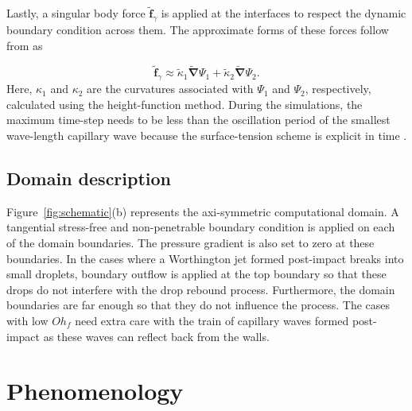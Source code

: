 Lastly, a singular body force $\boldsymbol{\tilde{f}}_\gamma$ is applied at the interfaces to respect the dynamic boundary condition across them. The approximate forms of these forces follow from \citet{brackbill1992continuum} as

\begin{equation}\label{Eqn::SurfaceTension}
	\boldsymbol{\tilde{f}}_\gamma \approx  \tilde{\kappa}_1\boldsymbol{\tilde{\nabla}}\Psi_1 +  \tilde{\kappa}_2\boldsymbol{\tilde{\nabla}}\Psi_2.
\end{equation}
\noindent Here, $\kappa_1$ and $\kappa_2$ are the curvatures associated with $\Psi_1$ and $\Psi_2$, respectively, calculated using the height-function method.  During the simulations, the maximum time-step needs to be less than the oscillation period of the smallest wave-length capillary wave because the surface-tension scheme is explicit in time \citep{popinet2009accurate, basiliskpopinet2}.

\subsection{Domain description}
Figure~\ref{fig:schematic}(b) represents the axi-symmetric computational domain. A tangential stress-free and non-penetrable boundary condition is applied on each of the domain boundaries. The pressure gradient is also set to zero at these boundaries. In the cases where a Worthington jet formed post-impact breaks into small droplets, boundary outflow is applied at the top boundary so that these drops do not interfere with the drop rebound process. Furthermore, the domain boundaries are far enough so that they do not influence the process. The cases with low $Oh_f$ need extra care with the train of capillary waves formed post-impact as these waves can reflect back from the walls. 

\section{Phenomenology} \label{sec:Phenomenology}

